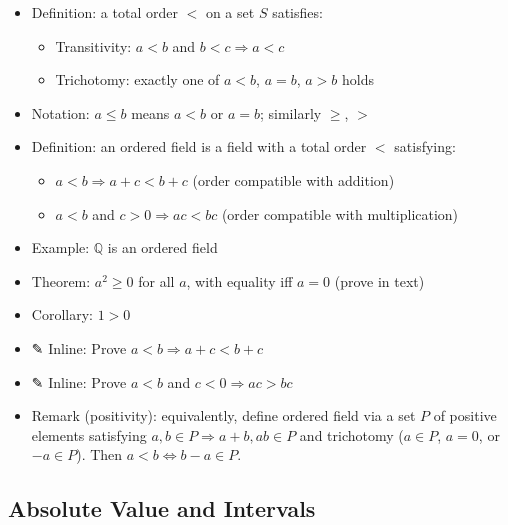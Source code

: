 \documentclass[
  10pt,
  letterpaper,
]{scrbook}
\providecommand{\tightlist}{%
  \setlength{\itemsep}{0pt}\setlength{\parskip}{0pt}}
\newcommand{\QQ}{\mathbb{Q}}
\begin{document}
\begin{itemize}
\tightlist
\item
  Definition: a total order \(<\) on a set \(S\) satisfies:

  \begin{itemize}
  \tightlist
  \item
    Transitivity: \(a < b\) and \(b < c \Rightarrow a < c\)
  \item
    Trichotomy: exactly one of \(a < b\), \(a = b\), \(a > b\) holds
  \end{itemize}
\item
  Notation: \(a \leq b\) means \(a < b\) or \(a = b\); similarly
  \(\geq\), \(>\)
\item
  Definition: an ordered field is a field with a total order \(<\)
  satisfying:

  \begin{itemize}
  \tightlist
  \item
    \(a < b \Rightarrow a + c < b + c\) (order compatible with addition)
  \item
    \(a < b\) and \(c > 0 \Rightarrow ac < bc\) (order compatible with
    multiplication)
  \end{itemize}
\item
  Example: \(\QQ\) is an ordered field
\item
  Theorem: \(a^2 \geq 0\) for all \(a\), with equality iff \(a = 0\)
  (prove in text)
\item
  Corollary: \(1 > 0\)
\item
  ✎ Inline: Prove \(a < b \Rightarrow a + c < b + c\)
\item
  ✎ Inline: Prove \(a < b\) and \(c < 0 \Rightarrow ac > bc\)
\item
  Remark (positivity): equivalently, define ordered field via a set
  \(P\) of positive elements satisfying
  \(a, b \in P \Rightarrow a + b, ab \in P\) and trichotomy
  (\(a \in P\), \(a = 0\), or \(-a \in P\)). Then
  \(a < b \Leftrightarrow b - a \in P\).
\end{itemize}

\subsection{Absolute Value and
Intervals}\label{absolute-value-and-intervals}
\end{document}
